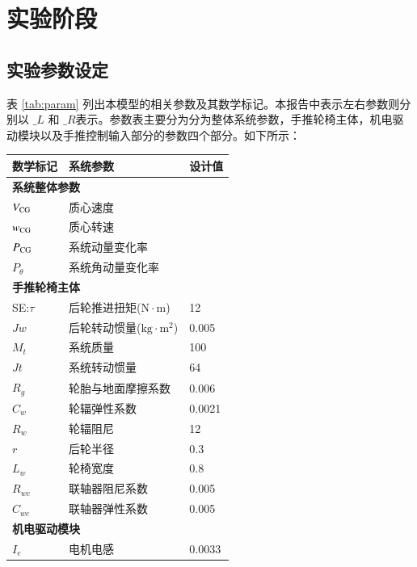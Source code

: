 \clearpage
\section{实验阶段}

\subsection{实验参数设定}

表 \ref{tab:param} 列出本模型的相关参数及其数学标记。本报告中表示左右参数则分别以 $ \_L $ 和 $ \_R $表示。参数表主要分为分为整体系统参数，手推轮椅主体，机电驱动模块以及手推控制输入部分的参数四个部分。如下所示：

\begin{table}[H]
	\footnotesize
	\caption{系统主要参数及其数学标记}\label{tab:param}
	\begin{longtable}{l|l|l}
		\toprule
		\textbf{数学标记} & \textbf{系统参数} & \textbf{设计值}\\
		\midrule
		\endhead
		\multicolumn{3}{l}{\textbf{系统整体参数}} \\ %
		\midrule
		$ V_{\rm{CG}} $ & 质心速度 & \\
		$ w_{\rm{CG}} $ & 质心转速 & \\
		$ P_{\rm{CG}} $ & 系统动量变化率 & \\
		$ P_{\theta} $ & 系统角动量变化率 & \\
		\midrule
		\multicolumn{3}{l}{\textbf{手推轮椅主体}} \\
		\midrule
		SE:$\tau$ & 后轮推进扭矩($ \mathrm{N} \cdot \mathrm{m} $) & 12 \\
		$ J w $ & 后轮转动惯量($ \mathrm{kg} \cdot \mathrm{m}^2 $) & 0.005 \\
		$ M_t $ & 系统质量 & 100 \\
		$ J t $ & 系统转动惯量 & 64 \\
		$ R_g $ & 轮胎与地面摩擦系数 & 0.006 \\
		$ C_w $ & 轮辐弹性系数 & 0.0021 \\
		$ R_w $ & 轮辐阻尼 & 12 \\
		$ r $ & 后轮半径 & 0.3 \\
		$ L_w $ & 轮椅宽度 & 0.8 \\
		$ R_{wc} $ & 联轴器阻尼系数 & 0.005 \\
		$ C_{wc} $ & 联轴器弹性系数 & 0.005 \\
		\midrule
		\multicolumn{3}{l}{\textbf{机电驱动模块}} \\
		\midrule
		$ I_e $ & 电机电感 & 0.0033 \\

\end{longtable}
\end{table}

